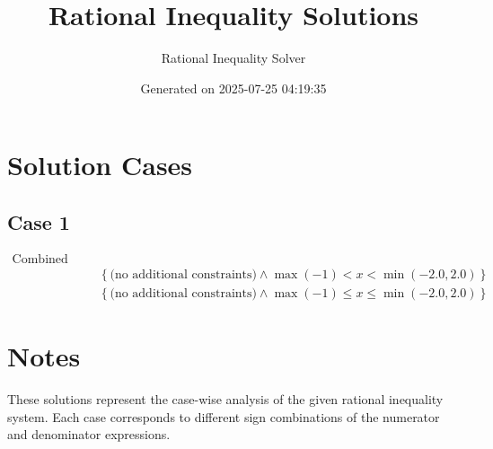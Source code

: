 \documentclass{article}
\title{Rational Inequality Solutions}
\author{Rational Inequality Solver}
\date{Generated on 2025-07-25 04:19:35}
\begin{document}
\maketitle

\section{Solution Cases}

\subsection{Case 1}

\begin{align}
\text{Combined Cases} \\
& \left\{\text{(no additional constraints)} \wedge \max\left(-1\right) < x < \min\left(-2.0, 2.0\right)\right\} \\
& \left\{\text{(no additional constraints)} \wedge \max\left(-1\right) \le x \le \min\left(-2.0, 2.0\right)\right\}
\end{align}


\section{Notes}

These solutions represent the case-wise analysis of the given rational inequality system. Each case corresponds to different sign combinations of the numerator and denominator expressions.
\end{document}
